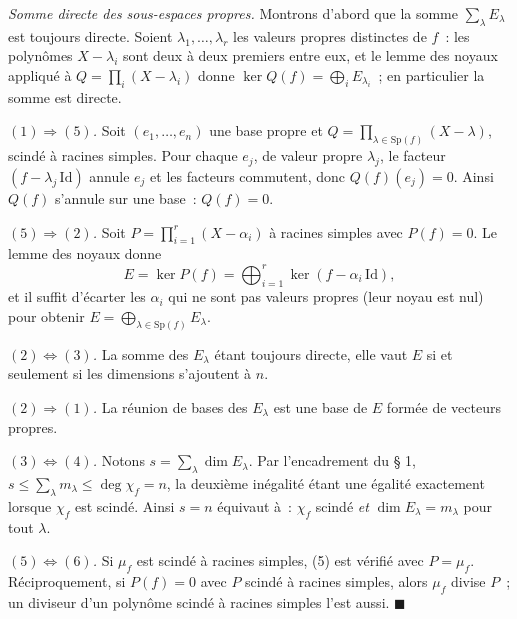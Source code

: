 \begin{mdframed}[style=proofbar]
  \textit{Somme directe des sous-espaces propres.} Montrons d'abord que la
  somme $\sum_{\lambda} E_\lambda$ est toujours directe. Soient
  $\lambda_1, \ldots, \lambda_r$ les valeurs propres distinctes de $f$~:
  les polynômes $X - \lambda_i$ sont deux à deux premiers entre eux, et le
  lemme des noyaux appliqué à $Q = \prod_i (X - \lambda_i)$ donne
  $\ker Q(f) = \bigoplus_i E_{\lambda_i}$~; en particulier la somme est
  directe.

  \smallskip
  \textit{$(1) \Rightarrow (5)$.} Soit $(e_1,\ldots,e_n)$ une base propre et
  $Q = \prod_{\lambda \in \mathrm{Sp}(f)} (X-\lambda)$, scindé à racines
  simples. Pour chaque $e_j$, de valeur propre $\lambda_j$, le facteur
  $(f - \lambda_j\,\mathrm{Id})$ annule $e_j$ et les facteurs commutent,
  donc $Q(f)(e_j) = 0$. Ainsi $Q(f)$ s'annule sur une base~: $Q(f) = 0$.

  \smallskip
  \textit{$(5) \Rightarrow (2)$.} Soit $P = \prod_{i=1}^{r}(X - \alpha_i)$ à
  racines simples avec $P(f) = 0$. Le lemme des noyaux donne
  \[
    E = \ker P(f) = \bigoplus_{i=1}^{r} \ker(f - \alpha_i\,\mathrm{Id}),
  \]
  et il suffit d'écarter les $\alpha_i$ qui ne sont pas valeurs propres
  (leur noyau est nul) pour obtenir $E = \bigoplus_{\lambda\in\mathrm{Sp}(f)} E_\lambda$.

  \smallskip
  \textit{$(2) \Leftrightarrow (3)$.} La somme des $E_\lambda$ étant toujours
  directe, elle vaut $E$ si et seulement si les dimensions s'ajoutent à $n$.

  \smallskip
  \textit{$(2) \Rightarrow (1)$.} La réunion de bases des $E_\lambda$ est une
  base de $E$ formée de vecteurs propres.

  \smallskip
  \textit{$(3) \Leftrightarrow (4)$.} Notons $s = \sum_\lambda \dim E_\lambda$.
  Par l'encadrement du § 1, $s \leq \sum_\lambda m_\lambda \leq \deg \chi_f = n$,
  la deuxième inégalité étant une égalité exactement lorsque $\chi_f$ est
  scindé. Ainsi $s = n$ équivaut à~: $\chi_f$ scindé \emph{et}
  $\dim E_\lambda = m_\lambda$ pour tout $\lambda$.

  \smallskip
  \textit{$(5) \Leftrightarrow (6)$.} Si $\mu_f$ est scindé à racines simples,
  (5) est vérifié avec $P = \mu_f$. Réciproquement, si $P(f) = 0$ avec $P$
  scindé à racines simples, alors $\mu_f$ divise $P$~; un diviseur d'un
  polynôme scindé à racines simples l'est aussi.
  \hfill$\blacksquare$
\end{mdframed}

